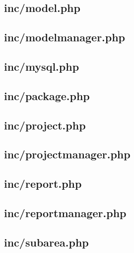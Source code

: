 \documentclass[11pt,a4paper,spanish,twoside]{book}
\begin{document}
\subsection{inc/model.php}
%

\subsection{inc/modelmanager.php}
%

\subsection{inc/mysql.php}
%

\subsection{inc/package.php}
%

\subsection{inc/project.php}
%

\subsection{inc/projectmanager.php}
%

\subsection{inc/report.php}
%

\subsection{inc/reportmanager.php}
%

\subsection{inc/subarea.php}
%
\end{document}
